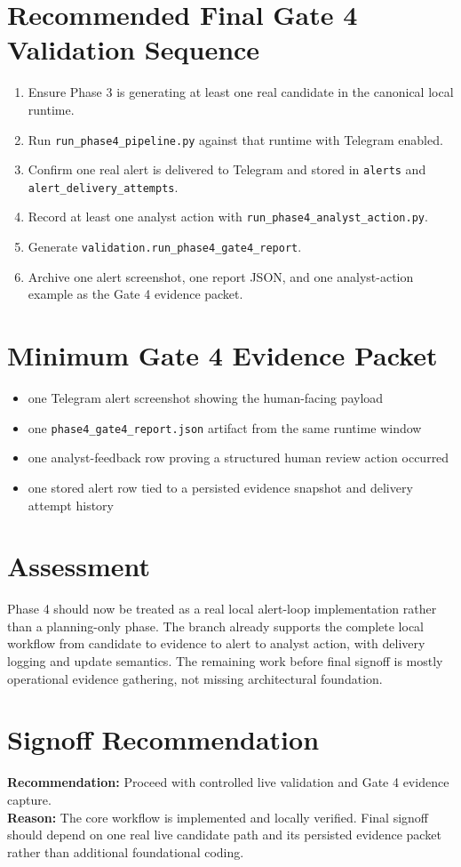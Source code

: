 \documentclass{article}
\begin{document}
\section*{Recommended Final Gate 4 Validation Sequence}
\begin{enumerate}
\item Ensure Phase 3 is generating at least one real candidate in the canonical local runtime.
\item Run \texttt{run\_phase4\_pipeline.py} against that runtime with Telegram enabled.
\item Confirm one real alert is delivered to Telegram and stored in \texttt{alerts} and \texttt{alert\_delivery\_attempts}.
\item Record at least one analyst action with \texttt{run\_phase4\_analyst\_action.py}.
\item Generate \texttt{validation.run\_phase4\_gate4\_report}.
\item Archive one alert screenshot, one report JSON, and one analyst-action example as the Gate 4 evidence packet.
\end{enumerate}

\section*{Minimum Gate 4 Evidence Packet}
\begin{itemize}
\item one Telegram alert screenshot showing the human-facing payload
\item one \texttt{phase4\_gate4\_report.json} artifact from the same runtime window
\item one analyst-feedback row proving a structured human review action occurred
\item one stored alert row tied to a persisted evidence snapshot and delivery attempt history
\end{itemize}

\section*{Assessment}
Phase 4 should now be treated as a real local alert-loop implementation rather than a planning-only phase. The branch already supports the complete local workflow from candidate to evidence to alert to analyst action, with delivery logging and update semantics. The remaining work before final signoff is mostly operational evidence gathering, not missing architectural foundation.

\section*{Signoff Recommendation}
\textbf{Recommendation:} Proceed with controlled live validation and Gate 4 evidence capture.\\
\textbf{Reason:} The core workflow is implemented and locally verified. Final signoff should depend on one real live candidate path and its persisted evidence packet rather than additional foundational coding.
\end{document}
